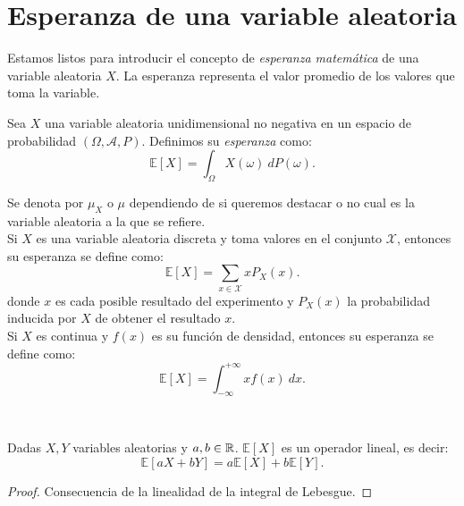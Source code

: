 \documentclass[oneside,openright,titlepage,numbers=noenddot,openany,headinclude,footinclude=true,
cleardoublepage=empty,abstractoff,BCOR=5mm,paper=a4,fontsize=12pt,main=spanish]{scrreprt}
\begin{document}
\section{Esperanza de una variable aleatoria}

Estamos listos para introducir el concepto de \textit{esperanza matemática} de una variable aleatoria $X$. La esperanza representa el valor promedio de los valores que toma la variable.\\


\begin{definition}
Sea $X$ una variable aleatoria unidimensional no negativa en un espacio de probabilidad $(\Omega, \mathcal{A},P)$. Definimos su \textit{esperanza} como: $$\mathbb{E}[X]=\int_{\Omega} X(\omega) \ dP(\omega).$$

Se denota por $\mu_X$ o $\mu$ dependiendo de si queremos destacar o no cual es la variable aleatoria a la que se refiere.\\

Si $X$ es una variable aleatoria discreta y toma valores en el conjunto $\mathcal{X}$, entonces su esperanza se define como: $$\mathbb{E}[X]=\sum_{x\in \mathcal{X}} x P_X(x).$$ donde $x$ es cada posible resultado del experimento y $P_X(x)$ la probabilidad inducida por $X$ de obtener el resultado $x$.\\

Si $X$ es continua y $f(x)$ es su función de densidad, entonces su esperanza se define como: $$\mathbb{E}[X]=\int_{-\infty}^{+\infty}x f(x) \ dx.$$
\end{definition}\

\begin{proposition}
Dadas $X,Y$ variables aleatorias y $a,b\in \mathbb{R}$. $\mathbb{E}[X]$ es un operador lineal, es decir: $$\mathbb{E}[aX+bY]=a\mathbb{E}[X]+b\mathbb{E}[Y].$$ 
\end{proposition}

\begin{proof}
Consecuencia de la linealidad de la integral de Lebesgue.
\end{proof}\
\end{document}
